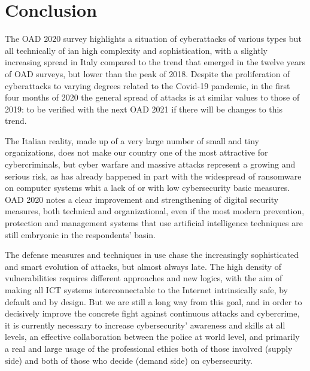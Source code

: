\documentclass{easychair}
\begin{document}
\section{Conclusion}\label{sec:Conclusion}

The OAD 2020 survey highlights a situation of cyberattacks of various types but all technically of ian high complexity and sophistication, with a slightly increasing 
spread  in Italy  compared to the trend that emerged in the twelve years of OAD surveys, but lower than the peak of 2018. Despite the proliferation of cyberattacks to varying 
degrees related to the Covid-19 pandemic, in the first four months of 2020 the general spread of attacks is at similar values to those of 2019: to be verified with the next OAD 2021
if there will be changes to this trend.


The Italian reality, made up of a very large number of small and tiny organizations, does not make our country one of the most attractive for cybercriminals, but cyber warfare
and massive attacks represent a growing and serious risk, as has already happened in part with the widespread of ransomware on computer systems whit a lack of or  with low 
cybersecurity  basic measures. OAD 2020 notes a clear improvement and strengthening of digital security measures, both technical and organizational, even if the most modern 
prevention, protection and management systems that use artificial intelligence techniques are still embryonic  in the respondents' basin.


The defense measures and techniques in use chase the increasingly sophisticated and smart evolution of attacks, but almost always late. The high density of vulnerabilities 
requires different approaches and new logics, with the aim of making all ICT systems interconnectable to the Internet intrinsically safe, by default and by design. But we are 
still a long way from this goal, and in order to decisively improve the concrete fight against continuous attacks and cybercrime, it is currently necessary to increase 
cybersecurity’ awareness and skills at all levels, an effective collaboration between the police at world level, and primarily a real and large usage of the professional ethics
 both of those involved (supply side) and both of those who decide (demand side) on cybersecurity.



\end{document}
